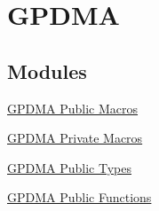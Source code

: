 \hypertarget{group___g_p_d_m_a}{\section{\-G\-P\-D\-M\-A}
\label{group___g_p_d_m_a}
}
\subsection*{\-Modules}
\begin{DoxyCompactItemize}
\item 
\hyperlink{group___g_p_d_m_a___public___macros}{\-G\-P\-D\-M\-A Public Macros}
\item 
\hyperlink{group___g_p_d_m_a___private___macros}{\-G\-P\-D\-M\-A Private Macros}
\item 
\hyperlink{group___g_p_d_m_a___public___types}{\-G\-P\-D\-M\-A Public Types}
\item 
\hyperlink{group___g_p_d_m_a___public___functions}{\-G\-P\-D\-M\-A Public Functions}
\end{DoxyCompactItemize}
